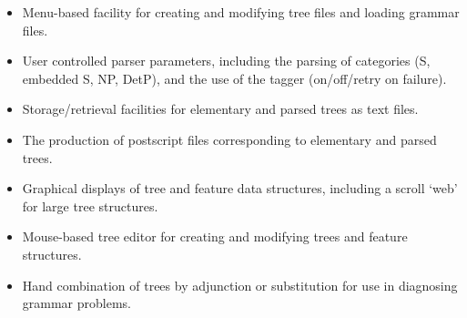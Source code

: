 \begin{itemize}

\item Menu-based facility for creating and modifying tree files and 
loading grammar files.

\item User controlled parser parameters, including the parsing of
categories (S, embedded S, NP, DetP), and the use of the tagger (on/off/retry
on failure).

\item Storage/retrieval facilities for elementary and parsed trees as
text files.

\item The production of postscript files corresponding to elementary
and parsed trees.

\item Graphical displays of tree and feature data structures,
including a scroll `web' for large tree structures.

\item Mouse-based tree editor for creating and modifying trees and
feature structures.

\item Hand combination of trees by adjunction or substitution for use
in diagnosing grammar problems.

\end{itemize}


